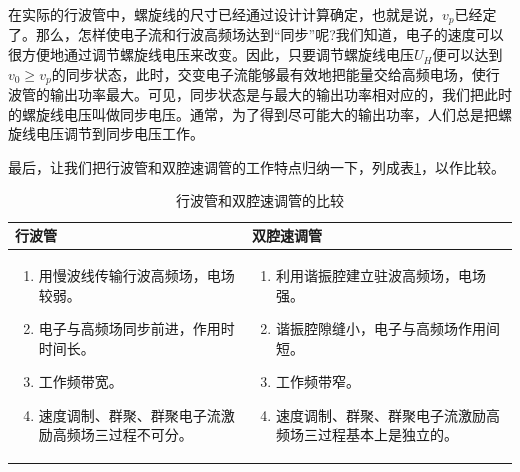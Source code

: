 在实际的行波管中，螺旋线的尺寸已经通过设计计算确定，也就是说，$ v_p $已经定了。那么，怎样使电子流和行波高频场达到“同步”呢?我们知道，电子的速度可以很方便地通过调节螺旋线电压来改变。因此，只要调节螺旋线电压$ U_H $便可以达到$ v_0 \geq v_p $的同步状态，此时，交变电子流能够最有效地把能量交给高频电场，使行波管的输出功率最大。可见，同步状态是与最大的输出功率相对应的，我们把此时的螺旋线电压叫做同步电压。通常，为了得到尽可能大的输出功率，人们总是把螺旋线电压调节到同步电压工作。

最后，让我们把行波管和双腔速调管的工作特点归纳一下，列成表\ref{tab:ch2-1}，以作比较。

\begin{table} 
	\caption{行波管和双腔速调管的比较}\label{tab:ch2-1}
	\begin{tabular}{p{6cm}p{6cm}}
		\toprule
		\centering 行波管          &  \hspace{6em}双腔速调管    \\ \midrule
		\begin{enumerate}
			\item 用慢波线传输行波高频场，电场较弱。
			\item 电子与高频场同步前进，作用时时间长。
			\item 工作频带宽。
			\item 速度调制、群聚、群聚电子流激励高频场三过程不可分。
		\end{enumerate}	    & \begin{enumerate}
			\item 利用谐振腔建立驻波高频场，电场强。  
			\item 谐振腔隙缝小，电子与高频场作用间短。
			\item 工作频带窄。 
			\item 速度调制、群聚、群聚电子流激励高频场三过程基本上是独立的。
		\end{enumerate}	  \\ \bottomrule
	\end{tabular}
\end{table}
 

